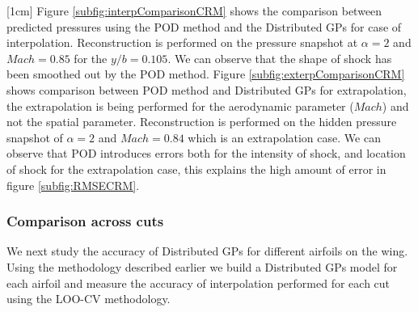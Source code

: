 [1cm]
Figure \ref{subfig:interpComparisonCRM} shows the comparison between predicted pressures using the POD method and the Distributed GPs for case of interpolation. Reconstruction is performed on the pressure snapshot at $\alpha = 2$ and $Mach = 0.85$ for the $y/b = 0.105$. We can observe that the shape of shock has been smoothed out by the POD method. Figure \ref{subfig:exterpComparisonCRM} shows comparison between POD method and Distributed GPs for extrapolation, the extrapolation is being performed for the aerodynamic parameter ($Mach$) and not the spatial parameter. Reconstruction is performed on the hidden pressure snapshot of $\alpha = 2$ and $Mach = 0.84$ which is an extrapolation case. We can observe that POD introduces errors both for the intensity of shock, and location of shock for the extrapolation case, this explains the high amount of error in figure \ref{subfig:RMSECRM}.  

\subsubsection{Comparison across cuts}
We next study the accuracy of Distributed GPs for different airfoils on the wing. Using the methodology described earlier we build a Distributed GPs model for each airfoil and measure the accuracy of interpolation performed for each cut using the LOO-CV methodology. 

